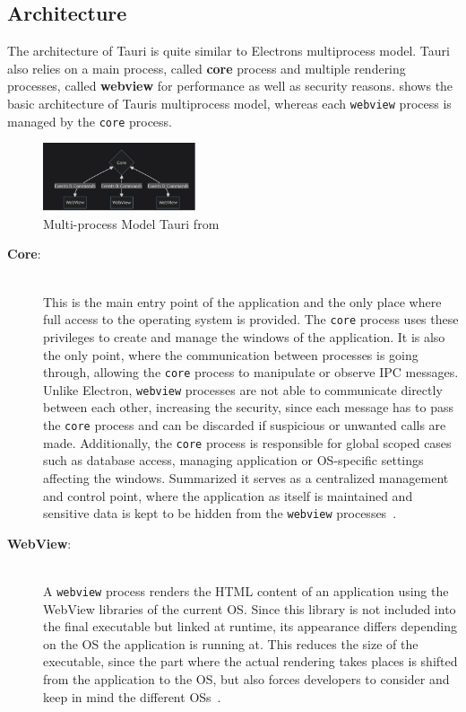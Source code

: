 \subsection{Architecture}
\label{subsec:tauri:architecture}
The architecture of Tauri is quite similar to Electrons multiprocess model.
Tauri also relies on a main process, called \textbf{core} process and multiple rendering processes, called \textbf{webview} for performance as well as security reasons.
 shows the basic architecture of Tauris multiprocess model, whereas each \texttt{webview} process is managed by the \texttt{core} process.
\begin{figure}[ht]
    \centering
    \includegraphics[width=0.4\textwidth]{images/TauriArchitecture}
    \caption{Multi-process Model Tauri from~\cite{tauri}}
    \label{fig:tauri:model}
\end{figure}

\begin{description}
    \item[\textbf{Core}:] \hfill \\ This is the main entry point of the application and the only place where full access to the operating system is provided.
    The \texttt{core} process uses these privileges to create and manage the windows of the application.
    It is also the only point, where the communication between processes is going through, allowing the \texttt{core} process to manipulate or observe \ac{IPC} messages.
    Unlike Electron, \texttt{webview} processes are not able to communicate directly between each other, increasing the security, since each message has to pass the \texttt{core} process and
    can be discarded if suspicious or unwanted calls are made.
    Additionally, the \texttt{core} process is responsible for global scoped cases such as database access, managing application or \ac{OS}-specific settings affecting the windows.
    Summarized it serves as a centralized management and control point, where the application as itself is maintained and sensitive data is kept to be hidden from the \texttt{webview} processes~\cite{tauri}.


    \item[\textbf{WebView}:] \hfill \\ A \texttt{webview} process renders the \ac{HTML} content of an application using the WebView libraries of the current \ac{OS}.
    Since this library is not included into the final executable but linked at runtime, its appearance differs depending on the \ac{OS} the application is running at.
    This reduces the size of the executable, since the part where the actual rendering takes places is shifted from the application to the \ac{OS}, but also forces
    developers to consider and keep in mind the different \ac{OS}s~\cite{tauri}.

\end{description}
 \newpage
